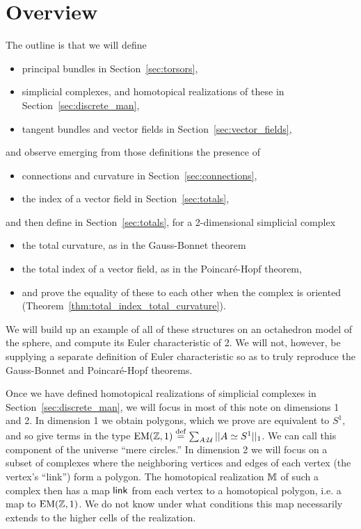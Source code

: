 \section{Overview}

The outline is that we will define 
\begin{itemize}
\item principal bundles in Section~\ref{sec:torsors},
\item simplicial complexes, and homotopical realizations of these in Section~\ref{sec:discrete_man},
\item tangent bundles and vector fields in Section~\ref{sec:vector_fields},
\end{itemize}
and observe emerging from those definitions the presence of
\begin{itemize}
\item connections and curvature in Section~\ref{sec:connections},
\item the index of a vector field in Section~\ref{sec:totals},
\end{itemize}
and then define in Section~\ref{sec:totals}, for a 2-dimensional simplicial complex
\begin{itemize}
\item the total curvature, as in the Gauss-Bonnet theorem
\item the total index of a vector field, as in the Poincaré-Hopf theorem,
\item and prove the equality of these to each other when the complex is oriented (Theorem~\ref{thm:total_index_total_curvature}).
\end{itemize}

We will build up an example of all of these structures on an octahedron model of the sphere, and compute its Euler characteristic of 2. We will not, however, be supplying a separate definition of Euler characteristic so as to truly reproduce the Gauss-Bonnet and Poincaré-Hopf theorems.

Once we have defined homotopical realizations of simplicial complexes in Section~\ref{sec:discrete_man}, we will focus in most of this note on dimensions 1 and 2. In dimension 1 we obtain polygons, which we prove are equivalent to \( S^1 \), and so give terms in the type \( \mathrm{EM}(\mathbb{Z},1)\stackrel{\mathrm{def}}{=} \sum_{A:\mathcal{U}}||A\simeq S^1||_1 \). We can call this component of the universe ``mere circles.'' In dimension 2 we will focus on a subset of complexes where the neighboring vertices and edges of each vertex (the vertex's ``link'') form a polygon. The homotopical realization \( \mathbb{M} \) of such a complex then has a map \( \operatorname{\mathsf{link}} \) from each vertex to a homotopical polygon, i.e. a map to \( \mathrm{EM}(\mathbb{Z},1) \). We do not know under what conditions this map necessarily extends to the higher cells of the realization.

